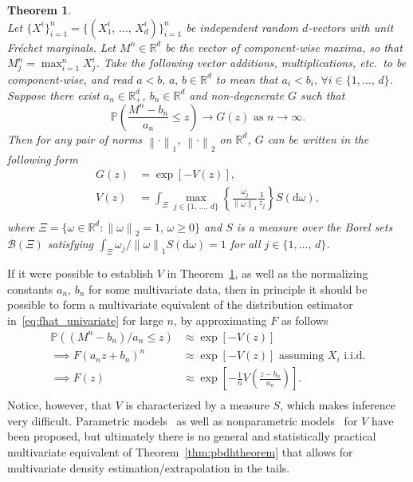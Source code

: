 \documentclass[11pt,twoside,openany]{book}
\newcommand{\norm}[1]{\left\lVert#1\right\rVert}
\newcommand{\prob}{\mathbb{P}}
\newcommand{\md}{\mathrm{d}}
\newcommand{\reals}{\mathbb{R}}
\newtheorem{Theorem}{Theorem}
\numberwithin{Theorem}{chapter}
\numberwithin{Definition}{chapter}
\numberwithin{Lemma}{chapter}
\numberwithin{Algorithm}{chapter}
\numberwithin{equation}{chapter}
\begin{document}
\begin{Theorem}\label{thm:mvextypes}\\
  Let $\{X^i\}_{i=1}^n=\{(X^i_1,\,\ldots,\,X^i_d)\}_{i=1}^n$ be independent
  random $d$-vectors with unit Fréchet marginals. Let $M^n\in \mathbb{R}^d$ be
  the vector of component-wise maxima, so that $M^n_j = \max_{i=1}^n
  X^i_j$.
  Take the following vector additions, multiplications, etc.\ to be component-wise,
  and read $a<b,\,a,\,b\in\mathbb{R}^d$ to mean that $a_i < b_i,\,\forall
  i\in\{1,\ldots,\,d\}$.
  Suppose there exist $a_n \in \mathbb{R}_{+}^d$, $b_n\in\mathbb{R}^d$ and
  non-degenerate $G$ such that
  \[
    \mathbb{P}\left(\frac{M^n - b_n}{a_n}\leq z\right)\rightarrow G(z) \text{ as } {n\rightarrow \infty}.
  \]
  Then for any pair of norms $\norm{\cdot}_1$, $\norm{\cdot}_2$ on $\reals^d$, $G$ can be
  written in the following form
  \[
  \begin{aligned}
    G(z) &= \exp\left[-V(z)\right],\\
    V(z) &= \int_{\Xi} \max_{j\in\{1,\,\ldots,\,d\}}\left\{\frac{\omega_j}{\norm{\omega}_1}\frac{1}{z_j}\right\} S(\md \omega),\\
  \end{aligned}
  \]
  where $\Xi = \{\omega\in\reals^d : \norm{\omega}_2 = 1,\,\omega \geq 0\}$ and
  $S$ is a measure over the Borel sets $\mathcal{B}(\Xi)$ satisfying
  $\int_{\Xi}\omega_j/\norm{\omega}_1 S(\md \omega)=1$ for all
  $j\in\{1,\ldots,\,d\}$.\\
\end{Theorem}

If it were possible to establish $V$ in Theorem~\ref{thm:mvextypes}, as well as
the normalizing constants $a_n$, $b_n$ for some multivariate
data, then
in principle it should be possible to form a multivariate equivalent
of the distribution estimator in~\eqref{eq:fhat_univariate} for large $n$,
by approximating $F$  as follows
\[
  \begin{aligned}
  \prob((M^n -  b_n)/ a_n\leq  z) &\approx \exp\left[-V( z)\right]\\
    \implies F(a_n  z +  b_n)^n &\approx \exp\left[-V( z)\right] \text{ assuming $X_i$ i.i.d.}\\
    \implies F(  z ) &\approx \exp\left[-\frac{1}{n}V\left(\frac{z - b_n}{a_n} \right)\right].\\
  \end{aligned}
\]
Notice, however, that $V$ is characterized by a measure $S$, which makes
inference very difficult.
Parametric models~\citep{tawn1990modelling}
as well as nonparametric models~\citep{marcon2017multivariate}
for $V$
have been proposed,
but ultimately there is no
general and statistically practical multivariate equivalent of
Theorem~\ref{thm:pbdhtheorem} that allows for multivariate density estimation/extrapolation in
the tails.
\end{document}

